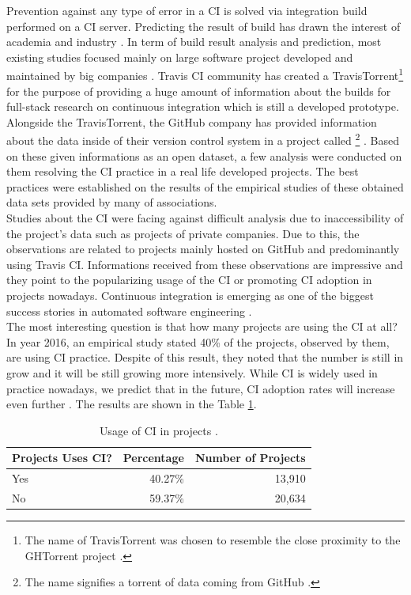 Prevention against any type of error in a CI is solved via integration build performed on a CI server. Predicting the result of build has drawn the interest of academia and industry \cite{ResultsOfCIbuild}. In term of build result analysis and prediction, most existing studies focused mainly on large software project developed and maintained by big companies \cite{ResultsOfCIbuild}. Travis CI community has created a TravisTorrent\footnote{The name of TravisTorrent was chosen to resemble the close proximity to the GHTorrent project \cite{TravisTorrentWEBPAGE}.} \cite{TravisTorrent} for the purpose of providing a huge amount of information about the builds for full-stack research on continuous integration which is still a developed prototype. Alongside the TravisTorrent, the GitHub company has provided information about the data inside of their version control system in a project called \footnote{The name signifies a torrent of data coming from GitHub \cite{GHTorrentWEBPAGE}.} \cite{GHTorrent}. Based on these given informations as an open dataset, a few analysis were conducted on them resolving the CI practice in a real life developed projects. The best practices were established on the results of the empirical studies of these obtained data sets provided by many of associations.\\

Studies about the CI were facing against difficult analysis due to inaccessibility of the project's data such as projects of private companies. Due to this, the observations are related to projects mainly hosted on GitHub and predominantly using Travis CI. Informations received from these observations are impressive and they point to the popularizing usage of the CI or promoting CI adoption in projects nowadays. Continuous integration is emerging as one of the biggest success stories in automated software engineering \cite{COPE}.\\

The most interesting question is that how many projects are using the CI at all? In year 2016, an empirical study stated 40\% \cite{COPE} of the projects, observed by them, are using CI practice. Despite of this result, they noted that the number is still in grow and it will be still growing more intensively. While CI is widely used in practice nowadays, we predict that in the future, CI adoption rates will increase even further \cite{COPE}. The results are shown in the Table \ref{table:CI_usage}.

\begin{table}[H]
    \centering
    \caption{Usage of CI in projects \cite{COPE}.}
    \label{table:CI_usage}
    \begin{tabular}{lrr}
        \hline
        Projects Uses CI? & Percentage & Number of Projects \\
        \hline
        Yes               & 40.27\%    & 13,910             \\
        No                & 59.37\%    & 20,634             \\
        \hline
    \end{tabular}
\end{table}

